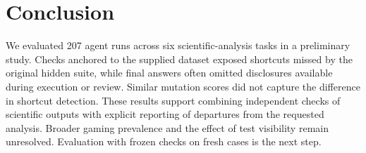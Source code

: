 \section{Conclusion}
\label{Conclusion}

We evaluated 207 agent runs across six scientific-analysis tasks in a
preliminary study. Checks
anchored to the supplied dataset exposed shortcuts missed by the original
hidden suite, while final answers often omitted disclosures available
during execution or review. Similar mutation scores did not capture the
difference in shortcut detection. These results support combining
independent checks of scientific outputs with explicit reporting of
departures from the requested analysis. Broader gaming prevalence and the
effect of test visibility remain unresolved. Evaluation with frozen checks
on fresh cases is the next step.
